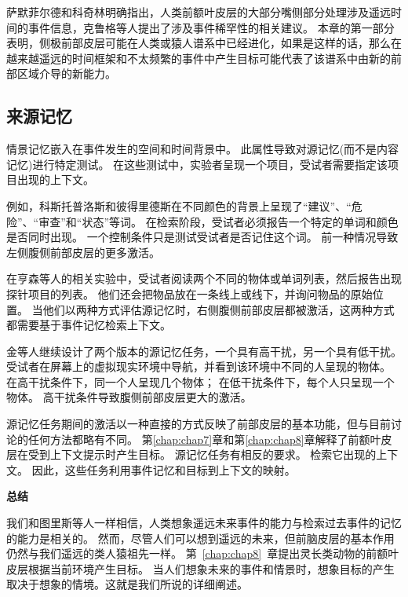萨默菲尔德和科奇林\cite{summerfield2009decision}明确指出，人类前额叶皮层的大部分嘴侧部分处理涉及遥远时间的事件信息，克鲁格等人\cite{krueger2007event}提出了涉及事件稀罕性的相关建议。
本章的第一部分表明，侧极前部皮层可能在人类或猿人谱系中已经进化，如果是这样的话，那么在越来越遥远的时间框架和不太频繁的事件中产生目标可能代表了该谱系中由新的前部区域介导的新能力。



\subsection{来源记忆}

情景记忆嵌入在事件发生的空间和时间背景中。
此属性导致对源记忆(而不是内容记忆)进行特定测试。
在这些测试中，实验者呈现一个项目，受试者需要指定该项目出现的上下文。


例如，科斯托普洛斯和彼得里德斯\cite{kostopoulos2008left}在不同颜色的背景上呈现了“建议”、“危险”、“审查”和“状态”等词。
在检索阶段，受试者必须报告一个特定的单词和颜色是否同时出现。
一个控制条件只是测试受试者是否记住这个词。
前一种情况导致左侧腹侧前部皮层的更多激活。


在亨森等人\cite{henson1999right}的相关实验中，受试者阅读两个不同的物体或单词列表，然后报告出现探针项目的列表。
他们还会把物品放在一条线上或线下，并询问物品的原始位置。
当他们以两种方式评估源记忆时，右侧腹侧前部皮层都被激活，这两种方式都需要基于事件记忆检索上下文。


金等人\cite{king2005anterior}继续设计了两个版本的源记忆任务，一个具有高干扰，另一个具有低干扰。
受试者在屏幕上的虚拟现实环境中导航，并看到该环境中不同的人呈现的物体。
在高干扰条件下，同一个人呈现几个物体；
在低干扰条件下，每个人只呈现一个物体。
高干扰条件导致腹侧前部皮层更大的激活。


源记忆任务期间的激活以一种直接的方式反映了前部皮层的基本功能，但与目前讨论的任何方法都略有不同。
第\ref{chap:chap7}章和第\ref{chap:chap8}章解释了前额叶皮层在受到上下文提示时产生目标。
源记忆任务有相反的要求。
检索它出现的上下文。
因此，这些任务利用事件记忆和目标到上下文的映射。



\textbf{总结}

我们和图里斯等人一样相信，人类想象遥远未来事件的能力与检索过去事件的记忆的能力是相关的。
然而，尽管人们可以想到遥远的未来，但前脑皮层的基本作用仍然与我们遥远的类人猿祖先一样。
第~\ref{chap:chap8}~章提出灵长类动物的前额叶皮层根据当前环境产生目标。
当人们想象未来的事件和情景时，想象目标的产生取决于想象的情境。这就是我们所说的详细阐述。



